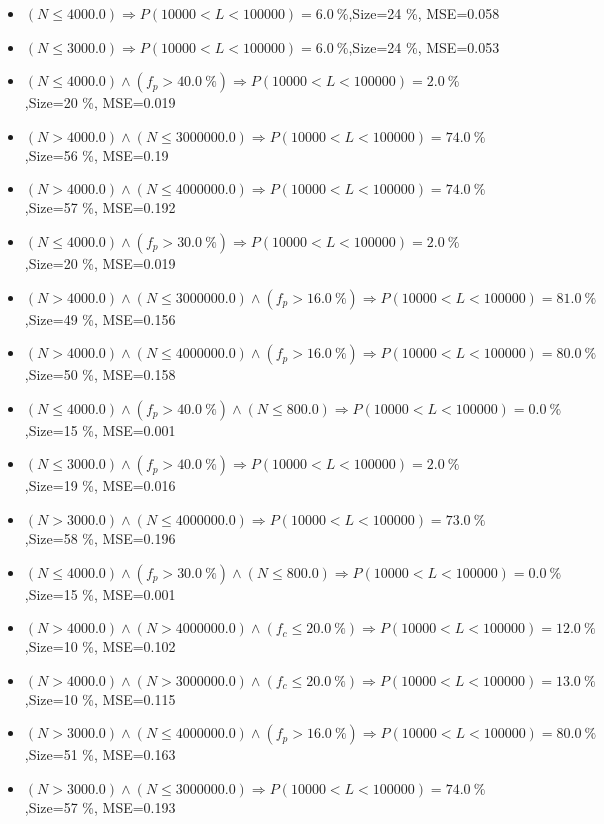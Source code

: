 \documentclass[numbered]{CSL}
\begin{document}
\begin{itemize}
\item $(N \leq 4000.0) \Rightarrow P(10 000 < L < 100 000) = 6.0~\%$,\hfill Size=24 \%, MSE=0.058
\item $(N \leq 3000.0) \Rightarrow P(10 000 < L < 100 000) = 6.0~\%$,\hfill Size=24 \%, MSE=0.053
\item $(N \leq 4000.0) \land (f_p > 40.0~\%) \Rightarrow P(10 000 < L < 100 000) = 2.0~\%$,\hfill Size=20 \%, MSE=0.019
\item $(N > 4000.0) \land (N \leq 3000000.0) \Rightarrow P(10 000 < L < 100 000) = 74.0~\%$,\hfill Size=56 \%, MSE=0.19
\item $(N > 4000.0) \land (N \leq 4000000.0) \Rightarrow P(10 000 < L < 100 000) = 74.0~\%$,\hfill Size=57 \%, MSE=0.192
\item $(N \leq 4000.0) \land (f_p > 30.0~\%) \Rightarrow P(10 000 < L < 100 000) = 2.0~\%$,\hfill Size=20 \%, MSE=0.019
\item $(N > 4000.0) \land (N \leq 3000000.0) \land (f_p > 16.0~\%) \Rightarrow P(10 000 < L < 100 000) = 81.0~\%$,\hfill Size=49 \%, MSE=0.156
\item $(N > 4000.0) \land (N \leq 4000000.0) \land (f_p > 16.0~\%) \Rightarrow P(10 000 < L < 100 000) = 80.0~\%$,\hfill Size=50 \%, MSE=0.158
\item $(N \leq 4000.0) \land (f_p > 40.0~\%) \land (N \leq 800.0) \Rightarrow P(10 000 < L < 100 000) = 0.0~\%$,\hfill Size=15 \%, MSE=0.001
\item $(N \leq 3000.0) \land (f_p > 40.0~\%) \Rightarrow P(10 000 < L < 100 000) = 2.0~\%$,\hfill Size=19 \%, MSE=0.016
\item $(N > 3000.0) \land (N \leq 4000000.0) \Rightarrow P(10 000 < L < 100 000) = 73.0~\%$,\hfill Size=58 \%, MSE=0.196
\item $(N \leq 4000.0) \land (f_p > 30.0~\%) \land (N \leq 800.0) \Rightarrow P(10 000 < L < 100 000) = 0.0~\%$,\hfill Size=15 \%, MSE=0.001
\item $(N > 4000.0) \land (N > 4000000.0) \land (f_c \leq 20.0~\%) \Rightarrow P(10 000 < L < 100 000) = 12.0~\%$,\hfill Size=10 \%, MSE=0.102
\item $(N > 4000.0) \land (N > 3000000.0) \land (f_c \leq 20.0~\%) \Rightarrow P(10 000 < L < 100 000) = 13.0~\%$,\hfill Size=10 \%, MSE=0.115
\item $(N > 3000.0) \land (N \leq 4000000.0) \land (f_p > 16.0~\%) \Rightarrow P(10 000 < L < 100 000) = 80.0~\%$,\hfill Size=51 \%, MSE=0.163
\item $(N > 3000.0) \land (N \leq 3000000.0) \Rightarrow P(10 000 < L < 100 000) = 74.0~\%$,\hfill Size=57 \%, MSE=0.193

\end{itemize}
\end{document}
